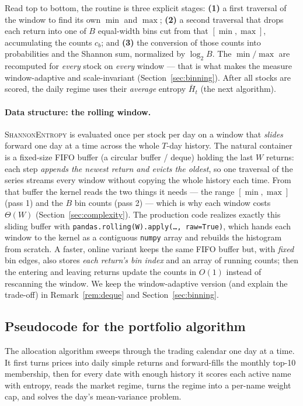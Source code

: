 \documentclass[a4paper,12pt]{article}
\begin{document}
Read top to bottom, the routine is three explicit stages: \textbf{(1)} a first traversal of the window to find its own $\min$ and $\max$; \textbf{(2)} a second traversal that drops each return into one of $B$ equal-width bins cut from that $[\min,\max]$, accumulating the counts $c_b$; and \textbf{(3)} the conversion of those counts into probabilities and the Shannon sum, normalized by $\log_2 B$. The $\min/\max$ are recomputed for \emph{every} stock on \emph{every} window --- that is what makes the measure window-adaptive and scale-invariant (Section~\ref{sec:binning}). After all stocks are scored, the daily regime uses their \emph{average} entropy $\bar H_t$ (the next algorithm).

\paragraph{Data structure: the rolling window.} \textsc{ShannonEntropy} is evaluated once per stock per day on a window that \emph{slides} forward one day at a time across the whole $T$-day history. The natural container is a fixed-size FIFO buffer (a circular buffer / deque) holding the last $W$ returns: each step \emph{appends the newest return and evicts the oldest}, so one traversal of the series streams every window without copying the whole history each time. From that buffer the kernel reads the two things it needs --- the range $[\min,\max]$ (pass 1) and the $B$ bin counts (pass 2) --- which is why each window costs $\Theta(W)$ (Section~\ref{sec:complexity}). The production code realizes exactly this sliding buffer with \texttt{pandas.rolling(W).apply(\ldots,\,raw=True)}, which hands each window to the kernel as a contiguous \texttt{numpy} array and rebuilds the histogram from scratch. A faster, online variant keeps the same FIFO buffer but, with \emph{fixed} bin edges, also stores \emph{each return's bin index} and an array of running counts; then the entering and leaving returns update the counts in $O(1)$ instead of rescanning the window. We keep the window-adaptive version (and explain the trade-off) in Remark~\ref{rem:deque} and Section~\ref{sec:binning}.

\subsection{Pseudocode for the portfolio algorithm}

The allocation algorithm sweeps through the trading calendar one day at a time. It first turns prices into daily simple returns and forward-fills the monthly top-10 membership, then for every date with enough history it scores each active name with entropy, reads the market regime, turns the regime into a per-name weight cap, and solves the day's mean-variance problem.
\end{document}
